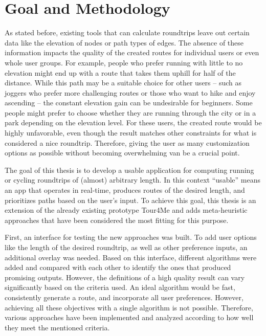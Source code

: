 


\section{Goal and Methodology}
\label{sec:goal}

As stated before, existing tools that can calculate roundtrips leave out certain data like the elevation of nodes or path types of edges.
The absence of these information impacts the quality of the created routes for individual users or even whole user groups. 
For example, people who prefer running with little to no elevation might end up with a route that takes them uphill for half of the distance.
While this path may be a suitable choice for other users -- such as joggers who prefer more challenging routes or those who want to hike and enjoy ascending -- the constant elevation gain can be undesirable for beginners.
Some people might prefer to choose whether they are running through the city or in a park depending on the elevation level.
For these users, the created route would be highly unfavorable, even though the result matches other constraints for what is considered a nice roundtrip.
Therefore, giving the user as many customization options as possible without becoming overwhelming van be a crucial point. 


The goal of this thesis is to develop a usable application for computing running or cycling roundtrips of (almost) arbitrary length. 
In this context \enquote{usable} means an app that operates in real-time, produces routes of the desired length, and prioritizes paths based on the user's input. 
To achieve this goal, this thesis is an extension of the already existing prototype Tour4Me \cite{buchin_tour4me_2022} and adds meta-heuristic approaches that have been considered the most fitting for this purpose. 

First, an interface for testing the new approaches was built. 
To add user options like the length of the desired roundtrip, as well as other preference inputs, an additional overlay was needed.
Based on this interface, different algorithms were added and compared with each other to identify the ones that produced promising outputs.
However, the definitions of a high quality result can vary significantly based on the criteria used. 
An ideal algorithm would be fast, consistently generate a route, and incorporate all user preferences.
However, achieving all these objectives with a single algorithm is not possible. 
Therefore, various approaches have been implemented and analyzed according to how well they meet the mentioned criteria. 

